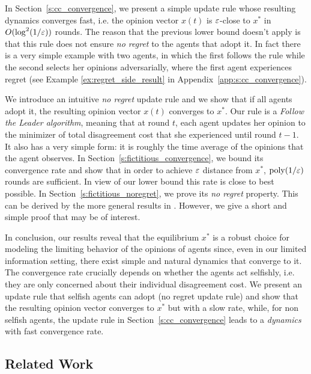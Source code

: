 In Section~\ref{s:cc_convergence}, we present a simple update rule
whose resulting dynamics converges fast, i.e.
the opinion vector $x(t)$ is $\varepsilon$-close to $x^*$ in
$O(\log^2 (1/\varepsilon))$ rounds. The reason that the previous lower
bound doesn't apply is that this rule does not ensure \emph{no regret}
to the agents that adopt it. In fact there is a very
simple example with two agents, in which the first follows the rule
while the second selects her opinions adversarially, where 
the first agent experiences regret (see Example \ref{ex:regret_side_result} 
in Appendix~\ref{app:s:cc_convergence}).


We introduce an intuitive \emph{no regret} update rule and we
show that if all agents adopt it, the resulting opinion vector $x(t)$
converges to $x^*$.  Our rule is a \emph{Follow the Leader algorithm}, meaning
that at round $t$, each agent updates her opinion to the minimizer of total
disagreement cost that she experienced until round $t-1$.  It also has a very
simple form: it is roughly the time average of the opinions that the agent
observes.  In Section~\ref{s:fictitious_convergence}, we bound its convergence
rate and show that in order to achieve $\varepsilon$ distance from $x^*$,
$\mathrm{poly}(1/\varepsilon)$ rounds are sufficient.  In view of our lower bound this rate
is close to best possible.  In Section~\ref{s:fictitious_noregret}, we prove its
\emph{no regret} property. This can be derived by the more general results
in \cite{HAK07}.  However, we give a short and simple proof that may be of
interest.

In conclusion, our results reveal that the equilibrium $x^*$ is a robust choice
for modeling the limiting behavior of the opinions of agents since, even in our
limited information setting, there exist simple and natural dynamics that converge
to it.  The convergence rate crucially depends on whether the
agents act selfishly, i.e. they are only concerned about their individual
disagreement cost.
We present an update rule that selfish agents can adopt (no regret update rule)
and show that the resulting opinion vector converges to $x^*$ but with a slow rate,
while, for non selfish agents, the update rule in Section~\ref{s:cc_convergence}
leads to a \emph{dynamics} with fast convergence rate.

\subsection{Related Work}

